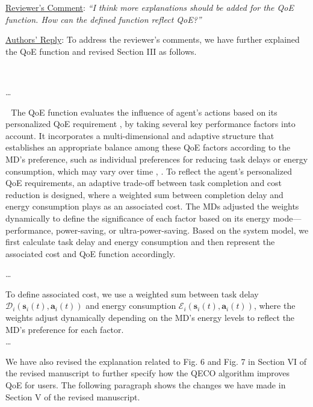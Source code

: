 \documentclass[12pt,draftclsnofoot,onecolumn]{IEEEtran}
\newcommand{\rev}[1]{{\color{blue}#1}} %
\newcommand{\rev}[1]{#1}
\newenvironment{my}[2]%
{\begin{list}{}%
{\setlength{\rightmargin}{#1}\setlength{\leftmargin}{#2}}%


 \item[]{}

} {\end{list}}
\begin{document}
\begin{enumerate}
\begin{my}{1cm}{1cm}
\end{my}

\vspace{6mm}




	\item \underline{Reviewer's Comment}: 
	\textit{``I think more explanations should be added for the QoE function. How can the defined function reflect QoE?''} \newline
	
	\underline{Authors' Reply}: To address the reviewer's comments, we have further explained the QoE function and revised Section III as follows.
	
			\begin{my}{1cm}{1cm}
		\rev{
			{\ 
				
				\dots 
				
\,\,\,\,The QoE function evaluates the influence of agent's actions based on its personalized QoE requirement \cite{wang2017qoe}, by taking several key performance factors into account. It incorporates a multi-dimensional and adaptive structure that establishes an appropriate balance among these QoE factors according to the MD's preference, such as individual preferences for reducing task delays or energy consumption, which may vary over time \cite{wang2019intelligent}, \cite{mehrabi2019energy}. To reflect the agent’s personalized QoE requirements, an adaptive trade-off between task completion and cost reduction is designed, where a weighted sum between completion delay and energy consumption plays as an associated cost. The MDs adjusted the weights dynamically to define the significance of each factor based on its energy mode—performance, power-saving, or ultra-power-saving. 
Based on the system model, we first calculate task delay and energy consumption and then represent the associated cost and QoE function accordingly.
								
				\dots
								
				To define associated cost, we use a weighted sum between task delay $\mathcal{D}_i(\boldsymbol{s}_i(t),\boldsymbol{a}_i(t))$ and energy consumption $\mathcal{E}_i(\boldsymbol{s}_i(t),\boldsymbol{a}_i(t))$, where the weights adjust dynamically depending on the MD's energy levels to reflect the MD's preference for each factor. \\\dots
}}
	\end{my}\vspace{6mm}

We have also revised the explanation related to Fig. 6 and Fig. 7 in Section VI of the revised manuscript to further specify how the QECO algorithm improves QoE for users. The following paragraph shows the changes we have made in Section V of the revised manuscript.
\begin{my}{1cm}{1cm}
	\rev{
		{\ 
			
}}
\end{my}
\end{enumerate}
\end{document}
